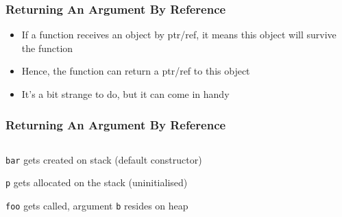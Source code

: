 \begin{frame}
  \frametitle{Returning An Argument By Reference}
  \begin{itemize}
    \item If a function receives an object by ptr/ref, it means
          this object will survive the function
    \item Hence, the function can return a ptr/ref to this object
    \item It's a bit strange to do, but it can come in handy
  \end{itemize}
\end{frame}

\begin{frame}
  \frametitle{Returning An Argument By Reference}
  \begin{center}
    \begin{columns}
      \column{5cm}
      \column{4cm}
    \end{columns}
  \end{center}
  \vskip2mm
  \begin{overprint}
    \begin{center}
      {\tt bar} gets created on stack (default constructor)
    \end{center}

    \begin{center}
      {\tt p} gets allocated on the stack (uninitialised)
    \end{center}

    \begin{center}
      {\tt foo} gets called, argument {\tt b} resides on heap
    \end{center}


\end{overprint}
\end{frame}
